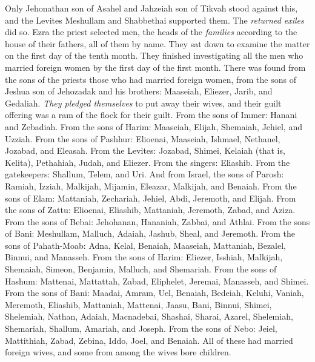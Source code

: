 \begin{biblechapter}
\verse Only Jehonathan son of Asahel and Jahzeiah son of Tikvah stood against this, and the Levites Meshullam and Shabbethai supported them.
\verse The \textit{returned exiles} did so. Ezra the priest selected men, the heads of the \textit{families} according to the house of their fathers, all of them by name. They sat down to examine the matter on the first day of the tenth month.
\verse They finished investigating all the men who married foreign women by the first day of the first month.
\verse There was found from the sons of the priests those who had married foreign women, from the sons of Jeshua son of Jehozadak and his brothers: Maaseiah, Eliezer, Jarib, and Gedaliah.
\verse \textit{They pledged themselves} to put away their wives, and their guilt offering was a ram of the flock for their guilt.
\verse From the sons of Immer: Hanani and Zebadiah.
\verse From the sons of Harim: Maaseiah, Elijah, Shemaiah, Jehiel, and Uzziah.
\verse From the sons of Pashhur: Elioenai, Maaseiah, Ishmael, Nethanel, Jozabad, and Eleasah.
\verse From the Levites: Jozabad, Shimei, Kelaiah (that is, Kelita), Pethahiah, Judah, and Eliezer.
\verse From the singers: Eliashib. From the gatekeepers: Shallum, Telem, and Uri.
\verse And from Israel, the sons of Parosh: Ramiah, Izziah, Malkijah, Mijamin, Eleazar, Malkijah, and Benaiah.
\verse From the sons of Elam: Mattaniah, Zechariah, Jehiel, Abdi, Jeremoth, and Elijah.
\verse From the sons of Zattu: Elioenai, Eliashib, Mattaniah, Jeremoth, Zabad, and Aziza.
\verse From the sons of Bebai: Jehohanan, Hananiah, Zabbai, and Athlai.
\verse From the sons of Bani: Meshullam, Malluch, Adaiah, Jashub, Sheal, and Jeremoth.
\verse From the sons of Pahath-Moab: Adna, Kelal, Benaiah, Maaseiah, Mattaniah, Bezalel, Binnui, and Manasseh.
\verse From the sons of Harim: Eliezer, Isshiah, Malkijah, Shemaiah, Simeon,
\verse Benjamin, Malluch, and Shemariah.
\verse From the sons of Hashum: Mattenai, Mattattah, Zabad, Eliphelet, Jeremai, Manasseh, and Shimei.
\verse From the sons of Bani: Maadai, Amram, Uel,
\verse Benaiah, Bedeiah, Keluhi,
\verse Vaniah, Meremoth, Eliashib,
\verse Mattaniah, Mattenai, Jaasu,
\verse Bani, Binnui, Shimei,
\verse Shelemiah, Nathan, Adaiah,
\verse Macnadebai, Shashai, Sharai,
\verse Azarel, Shelemiah, Shemariah,
\verse Shallum, Amariah, and Joseph.
\verse From the sons of Nebo: Jeiel, Mattithiah, Zabad, Zebina, Iddo, Joel, and Benaiah.
\verse All of these had married foreign wives, and some from among the wives bore children.
\end{biblechapter}

